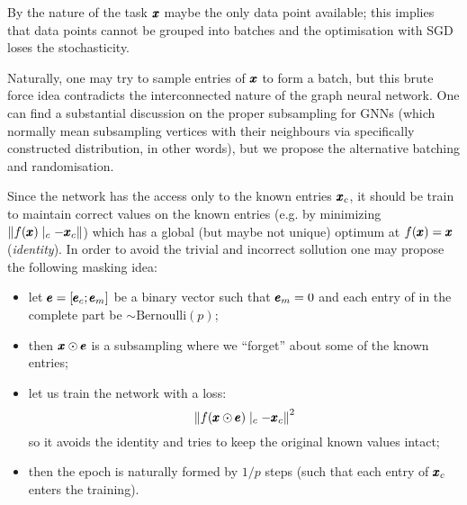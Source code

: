 \documentclass{mynotes}
\begin{document}
\begin{remark}
      By the nature of the task \( \pmb{x} \) maybe the only data point available; this implies that data points cannot be grouped into batches and the optimisation with SGD loses the stochasticity. 

      Naturally, one may try to sample entries of \( \pmb{x} \) to form a batch, but this brute force idea contradicts the interconnected nature of the graph neural network. One can find a substantial discussion on the proper subsampling for GNNs (which normally mean subsampling vertices with their neighbours via specifically constructed distribution, in other words), but we propose the alternative batching and randomisation.

      Since the network has the access only to the known entries \( \pmb{x}_c\), it should be train to maintain correct values on the known entries (e.g. by minimizing \( \| f(\pmb{x} )\mid_c - \pmb{x}_c \| \)) which has a global (but maybe not unique) optimum at \( f( \pmb{x}) = \pmb{x} \) (\emph{identity}). In order to avoid the trivial and incorrect sollution one may propose the following masking idea:
      \begin{itemize}
            \item let \( \pmb{e} = [ \pmb{e}_c; \pmb{e}_m] \) be a binary vector such that \( \pmb{e}_m = 0 \) and each entry of in the complete part be \( \sim \mathrm{Bernoulli} \left( p \right) \);
            \item then \( \pmb{x} \odot \pmb{e} \) is a subsampling where we ``forget'' about some of the known entries;
            \item let us train the network with a loss:
            \begin{equation}
                  \left\| f( \pmb{x} \odot \pmb{e} )\mid_c - \pmb{x}_c \right\|^2 
            \end{equation}
            so it avoids the identity and tries to keep the original known values intact;
            \item then the epoch is naturally formed by \( 1/p \) steps (such that each entry of \( \pmb{x}_c \) enters the training).
      \end{itemize}
\end{remark}
\end{document}
